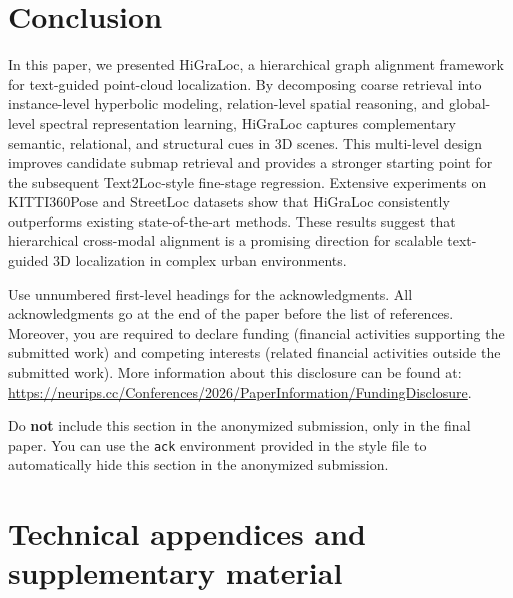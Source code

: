 \documentclass{article}
\begin{document}
\section{Conclusion}
In this paper, we presented HiGraLoc, a hierarchical graph alignment framework for text-guided point-cloud localization. By decomposing coarse retrieval into instance-level hyperbolic modeling, relation-level spatial reasoning, and global-level spectral representation learning, HiGraLoc captures complementary semantic, relational, and structural cues in 3D scenes. This multi-level design improves candidate submap retrieval and provides a stronger starting point for the subsequent Text2Loc-style fine-stage regression. Extensive experiments on KITTI360Pose and StreetLoc datasets show that HiGraLoc consistently outperforms existing state-of-the-art methods. These results suggest that hierarchical cross-modal alignment is a promising direction for scalable text-guided 3D localization in complex urban environments.
\begin{ack}
Use unnumbered first-level headings for the acknowledgments. All acknowledgments
go at the end of the paper before the list of references. Moreover, you are required to declare
funding (financial activities supporting the submitted work) and competing interests (related financial activities outside the submitted work).
More information about this disclosure can be found at: \url{https://neurips.cc/Conferences/2026/PaperInformation/FundingDisclosure}.

Do {\bf not} include this section in the anonymized submission, only in the final paper. You can use the \texttt{ack} environment provided in the style file to automatically hide this section in the anonymized submission.
\end{ack}




\appendix
\section{Technical appendices and supplementary material}
\end{document}

